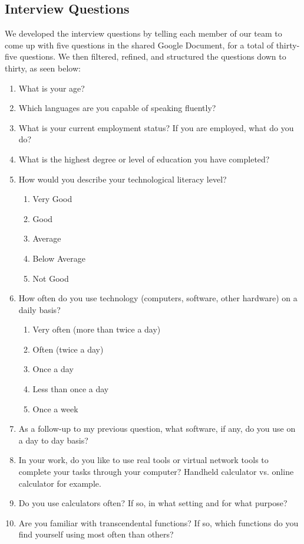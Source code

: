 \documentclass[11pt,onside]{report}
\begin{document}
\subsection{Interview Questions}
We developed the interview questions by telling each member of our team to come up with five questions in the shared Google Document, for a total of thirty-five questions. We then filtered, refined, and structured the questions down to thirty, as seen below:
\begin{enumerate}
    \item What is your age?
    \item Which languages are you capable of speaking fluently?
    \item What is your current employment status? If you are employed, what do you do?
    \item What is the highest degree or level of education you have completed?
    \item How would you describe your technological literacy level?
    \begin{enumerate}
        \item Very Good
        \item Good
        \item Average
        \item Below Average
        \item Not Good
    \end{enumerate}
    \item How often do you use technology (computers, software, other hardware) on a daily basis?
    \begin{enumerate}
        \item Very often (more than twice a day)
        \item Often (twice a day)
        \item Once a day
        \item Less than once a day
        \item Once a week
    \end{enumerate}
    \item As a follow-up to my previous question, what software, if any, do you use on a day to day basis?
    \item In your work, do you like to use real tools or virtual network tools to complete your tasks through your computer? Handheld calculator vs. online calculator for example.
    \item Do you use calculators often? If so, in what setting and for what purpose?
    \item Are you familiar with transcendental functions? If so, which functions do you find yourself using most often than others?

\end{enumerate}
\end{document}
